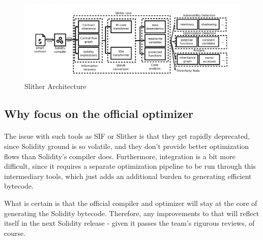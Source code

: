 \begin{figure}
    \centering
    \includegraphics[width=15cm]{images/slither_architecture.png}
    \caption{Slither Architecture}
    \label{fig:slither-architecture}
\end{figure}

\subsection{Why focus on the official optimizer}
\paragraph*{}
The issue with such tools as SIF or Slither is that they get rapidly deprecated, since Solidity ground is so volatile, and they don't provide better optimization flows than Solidity's compiler does. Furthermore, integration is a bit more difficult, since it requires a separate optimization pipeline to be run through this intermediary tools, which just adds an additional burden to generating efficient bytecode.

What is certain is that the official compiler and optimizer will stay at the core of generating the Solidity bytecode. Therefore, any improvements to that will reflect itself in the next Solidity release - given it passes the team's rigurous reviews, of course.